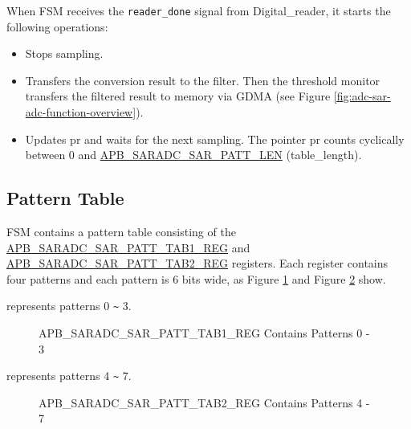\documentclass[main\_\_EN.tex]{subfiles}
\begin{document}
When FSM receives the \texttt{reader\_done} signal from Digital\_reader, it starts the following operations:

\begin{itemize}
    \item Stops sampling.
    \item Transfers the conversion result to the filter. Then the threshold monitor transfers the filtered result to memory via GDMA (see Figure \ref{fig:adc-sar-adc-function-overview}).
    \item Updates pr and waits for the next sampling. The pointer pr counts cyclically between 0 and \hyperref[fielddesc:APBSARADCSARPATTLEN]{APB\_SARADC\_SAR\_PATT\_LEN} (table\_length).
\end{itemize}

\subsection{Pattern Table}\label{sec:adc_pattern}

FSM contains a pattern table consisting of the \hyperref[regdesc:APBSARADCSARPATTTAB1REG]{APB\_SARADC\_SAR\_PATT\_TAB1\_REG} and \hyperref[regdesc:APBSARADCSARPATTTAB1REG]{APB\_SARADC\_SAR\_PATT\_TAB2\_REG} registers. Each register contains four patterns and each pattern is 6 bits wide, as Figure \ref{fig:adc-apb-saradc-sar-patt-tab1-reg-pattern-tab-entry0-entry3} and Figure \ref{fig:adc-apb-saradc-sar-patt-tab2-reg-pattern-tab-entry4-entry7} show.

%
%
%
%
%
\begin{regdesc}\begin{reglist}
\item [cmd \regindex{x}] represents patterns 0 \verb+~+ 3.
\end{reglist}\end{regdesc}
\vspace{-2em}
\begin{figure}[H]
    \centering
    \caption{APB\_SARADC\_SAR\_PATT\_TAB1\_REG Contains Patterns 0 - 3}
    \label{fig:adc-apb-saradc-sar-patt-tab1-reg-pattern-tab-entry0-entry3}
\end{figure}

%
%
%
%
%
\begin{regdesc}\begin{reglist}
\item [cmd \regindex{x}] represents patterns 4 \verb+~+ 7.
\end{reglist}\end{regdesc}
\vspace{-2em}
\begin{figure}[H]
    \centering
    \caption{APB\_SARADC\_SAR\_PATT\_TAB2\_REG Contains Patterns 4 - 7}
    \label{fig:adc-apb-saradc-sar-patt-tab2-reg-pattern-tab-entry4-entry7}
\end{figure}
\end{document}
